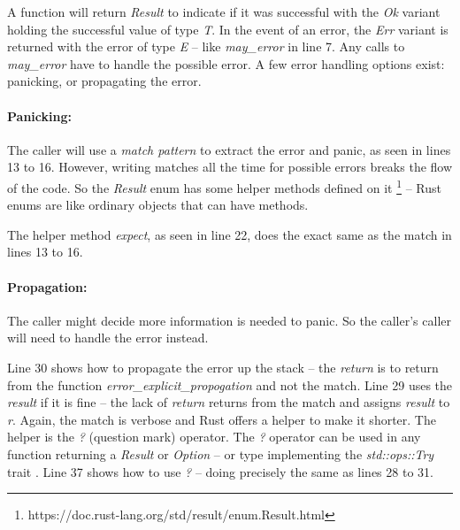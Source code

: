 A function will return \textit{Result} to indicate if it was successful with the \textit{Ok} variant holding the successful value of type \textit{T}.
In the event of an error, the \textit{Err} variant is returned with the error of type \textit{E} -- like \textit{may\_error} in line 7.
Any calls to \textit{may\_error} have to handle the possible error.
A few error handling options exist: panicking, or propagating the error.

\paragraph{Panicking:}
The caller will use a \textit{match pattern} to extract the error and panic, as seen in lines 13 to 16.
However, writing matches all the time for possible errors breaks the flow of the code.
So the \textit{Result} enum has some helper methods defined on it \footnote{https://doc.rust-lang.org/std/result/enum.Result.html} -- Rust enums are like ordinary objects that can have methods.

The helper method \textit{expect}, as seen in line 22, does the exact same as the match in lines 13 to 16.

\paragraph{Propagation:}
The caller might decide more information is needed to panic.
So the caller's caller will need to handle the error instead.

Line 30 shows how to propagate the error up the stack -- the \textit{return} is to return from the function \textit{error\_explicit\_propogation} and not the match.
Line 29 uses the \textit{result} if it is fine -- the lack of \textit{return} returns from the match and assigns \textit{result} to \textit{r}.
Again, the match is verbose and Rust offers a helper to make it shorter.
The helper is the \textit{?} (question mark) operator.
The \textit{?} operator can be used in any function returning a \textit{Result} or \textit{Option} -- or type implementing the \textit{std::ops::Try} trait \cite{klabnik_2019_01}.
Line 37 shows how to use \textit{?} -- doing precisely the same as lines 28 to 31.


